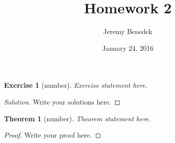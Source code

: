 \documentclass{article}
\title{Homework 2}
\author{Jeremy Benedek}
\date{January 24, 2016}
\newtheorem*{thm}{Theorem}
\newtheorem*{ex}{Exercise}
\newenvironment{solution}
  {\begin{proof}[Solution]}
  {\renewcommand{\qedsymbol}{}\end{proof}}
\begin{document}
\maketitle

\begin{ex}[number]
    Exercise statement here.
\end{ex}
\begin{solution}
    Write your solutions here.
\end{solution}

\begin{thm}[number]
    Theorem statement here.
\end{thm}

\begin{proof}
    Write your proof here.
\end{proof}
\end{document}
